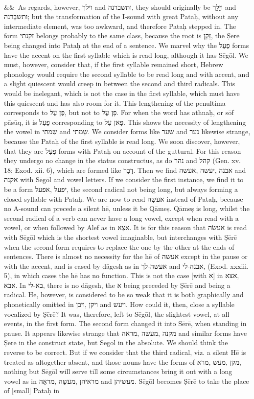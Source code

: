 \documentclass[12pt]{article}
\newcommand{\para}[1][]{\par\noindent\ifx&#1&\else\textsuperscript{\footnotesize #1}~\fi}
\begin{document}
\para As regards, however, ‏וילך‎ and ‏ותשברנה‎, they should originally be ‏ויֵלֵך‎ and ‏ותשבֵרנה‎; but the transformation of the I-sound with great Pataḥ, without any intermediate element, was too awkward, and therefore Pataḥ stepped in. The form ‏זקנתי‎ belongs probably to the same class, because the root is ‏זָקֵן‎, the Ṣērē being changed into Pataḥ at the end of a sentence. We marvel why the ‏פֶעֶל‎ forms have the accent on the first syllable which is read long, although it has Sēgōl. We must, however, consider that, if the first syllable remained short, Hebrew phonology would require the second syllable to be read long and with accent, and a slight quiescent would creep in between the second and third radicals. This would be inelegant, which is not the case in the first syllable, which must have this quiescent and has also room for it. This lengthening of the penultima corresponds to ‏פֶן עֶל‎, but not to ‏פָן עֱל‎. For when the word has athnaḥ, or sōf pāsūq, it is ‏פָעֶל‎ corresponding to ‏פָאן עֶל‎. This shows the necessity of lengthening the vowel in ‏שַמתי‎ and ‏שָמתי‎. We consider forms like ‏שער‎ and ‏נער‎ likewise strange, because the Pataḥ of the first syllable is read long. We soon discover, however, that they are ‏פֶעֶל‎ forms with Pataḥ on account of the guttural. For this reason they undergo no change in the status constructus, as do ‏נהר‎ and ‏קהל‎ (Gen. xv. 18; Exod. xii. 6), which are formed like ‏דָבָר‎. Then we find ‏אעשה‎, ‏יעשה‎, ‏אבנה‎ and ‏אקנה‎ with Sēgōl and vowel letters. If we consider the first instance, we find it to be a form ‏אפעל‎, ‏יפעל‎, the second radical not being long, but always forming a closed syllable with Pataḥ. We are now to read ‏אעשֶה‎ instead of Pataḥ, because no A-sound can precede a silent hē, unless it be Qāmeṣ. Qāmeṣ is long, whilst the second radical of a verb can never have a long vowel, except when read with a vowel, or when followed by Alef as in ‏אצֵא‎. It is for this reason that ‏אעשׂה‎ is read with Sēgōl which is the shortest vowel imaginable, but interchanges with Ṣērē when the second form requires to replace the one by the other at the ends of sentences. There is almost no necessity for the hē of ‏אעשה‎ except in the pause or with the accent, and is eased by dāgesh as in ‏אעשה-לך‎ and ‏אבנה-לי‎, (Exod. xxxiii. 5), in which cases the hē has no function. This is not the case [with ‏א‎] in ‏אצא‎, ‏אבא‎. In ‏בא-לי‎, there is no dāgesh, the ‏א‎ being preceded by Ṣērē and being a radical. Hē, however, is considered to be so weak that it is both graphically and phonetically omitted in ‏ויבן‎, ‏ויקן‎ and ‏ויעש‎. How could it, then, close a syllable vocalized by Ṣērē? It was, therefore, left to Sēgōl, the slightest vowel, at all events, in the first form. The second form changed it into Sērē, when standing in pause. It appears likewise strange that ‏מראה‎, ‏מעשה‎, ‏מקנה‎ and similar forms have Ṣērē in the construct state, but Sēgōl in the absolute. We should think the reverse to be correct. But if we consider that the third radical, viz. a silent Hē is treated as altogether absent, and those nouns have the forms of ‏מרא‎, ‏מעש‎, ‏מקן‎, nothing but Sēgōl will serve till some circumstances bring it out with a long vowel as in ‏מראֵה‎, ‏מעשֵה‎, ‏מראיהן‎ and ‏מעשיהן‎. Sēgōl becomes Ṣērē to take the place of [small] Pataḥ in 
\end{document}
